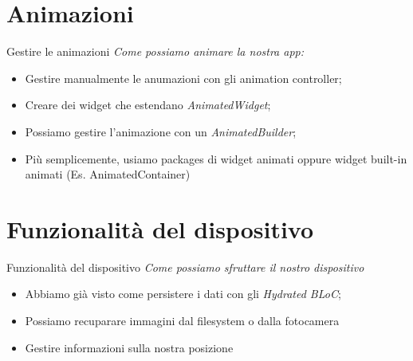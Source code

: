 \documentclass{../libs/presentation_format}
\begin{document}

\section{Animazioni}
\begin{frame}{Gestire le animazioni}
	\emph{Come possiamo animare la nostra app:}
	\begin{itemize}
		\item Gestire manualmente le anumazioni con gli animation controller;
		\item Creare dei  widget che estendano \emph{Animated­Widget};
		\item Possiamo gestire l'animazione con un \emph{AnimatedBuilder};
		\item Più semplicemente, usiamo packages di widget animati oppure widget built-in animati (Es. AnimatedContainer) \href{https://docs.flutter.dev/development/ui/widgets/animation}{}
	\end{itemize}
	\centering
	\href{https://docs.flutter.dev/development/ui/animations/tutorial}{}
\end{frame}


\section{Funzionalità del dispositivo}
\begin{frame}{Funzionalità del dispositivo}
	\emph{Come possiamo sfruttare il nostro dispositivo}
	\begin{itemize}
		\item Abbiamo già visto come persistere i dati con gli \emph{Hydrated BLoC};
		\item Possiamo recuparare immagini dal filesystem o dalla fotocamera \href{https://pub.dev/packages/image_picker}{}
		\item Gestire informazioni sulla nostra posizione \href{https://pub.dev/packages/location}{}
	\end{itemize}
\end{frame}

\end{document}
